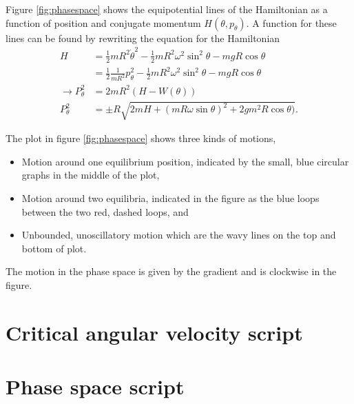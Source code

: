 \documentclass[11pt]{amsart}
\begin{document}
Figure \ref{fig:phasespace} shows the equipotential lines of the Hamiltonian as a function of position and conjugate momentum $H(\theta, p_\theta)$. A function for these lines can be found by rewriting the equation for the Hamiltonian
\begin{align*}
H &= \frac{1}{2}mR^2\dot{\theta}^2 - \frac{1}{2}mR^2\omega^2\sin^2\theta - mgR\cos\theta \\
  &= \frac{1}{2}\frac{1}{mR^2}p_\theta^2 - \frac{1}{2}mR^2\omega^2\sin^2\theta - mgR\cos\theta\\
\rightarrow P_\theta^2 &= 2mR^2(H - W(\theta)) \\
P_\theta^2  &= \pm R \sqrt{2mH + (mR\omega\sin\theta)^2 + 2gm^2R\cos\theta)}.
\end{align*}

The plot in figure \ref{fig:phasespace} shows three kinds of motions,
\begin{itemize}
\item Motion around one equilibrium position, indicated by the small, blue circular graphs in the middle of the plot,
\item Motion around two equilibria, indicated in the figure as the blue loops between the two red, dashed loops, and
\item Unbounded, unoscillatory motion which are the wavy lines on the top and bottom of plot.
\end{itemize}
The motion in the phase space is given by the gradient and is clockwise in the figure.


\begin{appendices}
\section{Critical angular velocity script}


\section{Phase space script}



\end{appendices}
\end{document}
